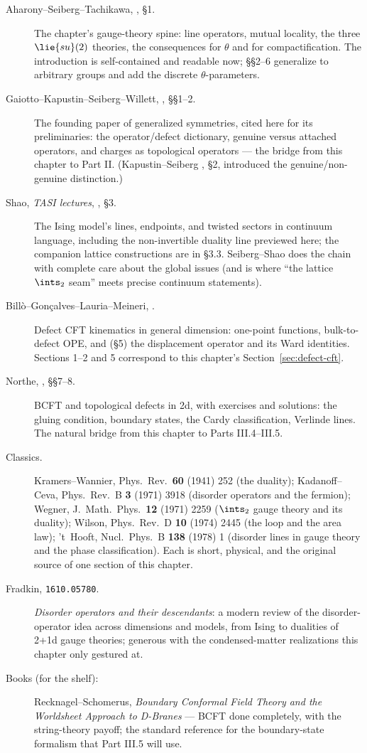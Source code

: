 \begin{description}
\item[Aharony--Seiberg--Tachikawa, , \S1.] The
chapter's gauge-theory spine: line operators, mutual locality, the
three $\lie{su}(2)$ theories, the consequences for $\theta$ and for
compactification. The introduction is self-contained and readable
now; \S\S2--6 generalize to arbitrary groups and add the discrete
$\theta$-parameters.
\item[Gaiotto--Kapustin--Seiberg--Willett, , \S\S1--2.]
The founding paper of generalized symmetries, cited here for its
preliminaries: the operator/defect dictionary, genuine versus
attached operators, and charges as topological operators --- the
bridge from this chapter to Part II. (Kapustin--Seiberg
, \S2, introduced the genuine/non-genuine
distinction.)
\item[Shao, \emph{TASI lectures}, , \S3.] The Ising
model's lines, endpoints, and twisted sectors in continuum language,
including the non-invertible duality line previewed here; the
companion lattice constructions are in \S3.3. Seiberg--Shao
 does the chain with complete care about the
global issues (and is where ``the lattice $\ints_2$ seam'' meets
precise continuum statements).
\item[Bill\`o--Gon\c{c}alves--Lauria--Meineri, .]
Defect CFT kinematics in general dimension: one-point functions,
bulk-to-defect OPE, and (\S5) the displacement operator and its Ward
identities. Sections 1--2 and 5 correspond to this chapter's
Section~\ref{sec:defect-cft}.
\item[Northe, , \S\S7--8.] BCFT and topological
defects in 2d, with exercises and solutions: the gluing condition,
boundary states, the Cardy classification, Verlinde lines. The
natural bridge from this chapter to Parts III.4--III.5.
\item[Classics.] Kramers--Wannier, Phys.\ Rev.\ \textbf{60} (1941)
252 (the duality); Kadanoff--Ceva, Phys.\ Rev.\ B \textbf{3} (1971)
3918 (disorder operators and the fermion); Wegner, J.\ Math.\ Phys.\
\textbf{12} (1971) 2259 ($\ints_2$ gauge theory and its duality);
Wilson, Phys.\ Rev.\ D \textbf{10} (1974) 2445 (the loop and the
area law); 't~Hooft, Nucl.\ Phys.\ B \textbf{138} (1978) 1 (disorder
lines in gauge theory and the phase classification). Each is short,
physical, and the original source of one section of this chapter.
\item[Fradkin, \texttt{1610.05780}.] \emph{Disorder operators and
their descendants}: a modern review of the disorder-operator idea
across dimensions and models, from Ising to dualities of 2+1d gauge
theories; generous with the condensed-matter realizations this
chapter only gestured at.
\item[Books (for the shelf):] Recknagel--Schomerus, \emph{Boundary
Conformal Field Theory and the Worldsheet Approach to D-Branes} ---
BCFT done completely, with the string-theory payoff; the standard
reference for the boundary-state formalism that Part III.5 will use.
\end{description}
